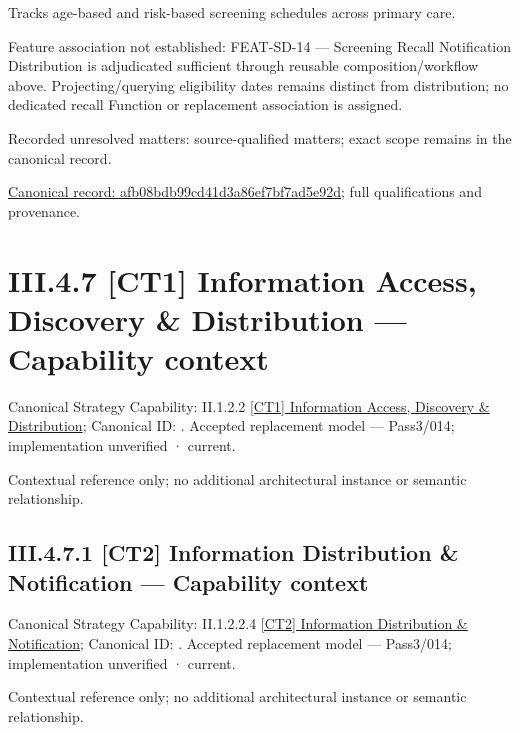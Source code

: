Tracks age-based and risk-based screening schedules across primary care.



Feature association not established: FEAT-SD-14 — Screening Recall Notification Distribution is adjudicated sufficient through reusable composition/workflow above. Projecting/querying eligibility dates remains distinct from distribution; no dedicated recall Function or replacement association is assigned.


{\small Recorded unresolved matters: source-qualified matters; exact scope remains in the canonical record.}\par
{\footnotesize \href{../../../../../../../../continuum/business/business-function/afb08bdb99cd41d3a86ef7bf7ad5e92d.md}{Canonical record: afb08bdb99cd41d3a86ef7bf7ad5e92d}; full qualifications and provenance.}\par
\section*{III.4.7 [CT1] Information Access, Discovery \& Distribution — Capability context}
\label{navigation:III.4.7}

{\small Canonical Strategy Capability: II.1.2.2 \hyperref[element:73cd0e24923a4c8b9678654a7cf0d81a]{[CT1] Information Access, Discovery \& Distribution}; Canonical ID: \texttt{}. Accepted replacement model — Pass3/014; implementation unverified · current.}\par
Contextual reference only; no additional architectural instance or semantic relationship.\par
\subsection*{III.4.7.1 [CT2] Information Distribution \& Notification — Capability context}
\label{navigation:III.4.7.1}

{\small Canonical Strategy Capability: II.1.2.2.4 \hyperref[element:1c2aad9aca7242149b4f30045c42711f]{[CT2] Information Distribution \& Notification}; Canonical ID: \texttt{}. Accepted replacement model — Pass3/014; implementation unverified · current.}\par
Contextual reference only; no additional architectural instance or semantic relationship.\par

